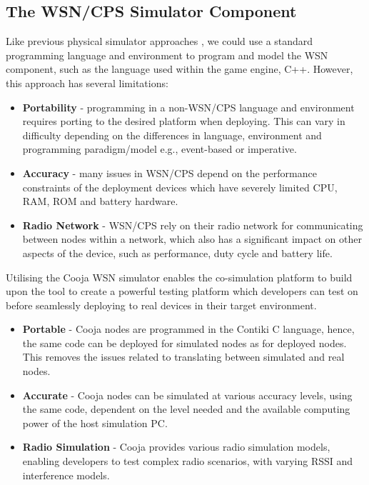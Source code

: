 \subsection{The WSN/CPS Simulator Component} %
\label{sub:a_wsn_cps_simulator}
Like previous physical simulator approaches \cite{6815220}, we could use a standard programming language and environment to program and model the WSN component, such as the language used within the game engine, C++. However, this approach has several limitations:
\begin{itemize}
  \item \textbf{Portability} - programming in a non-WSN/CPS language and environment requires porting to the desired platform when deploying. This can vary in difficulty depending on the differences in language, environment and programming paradigm/model e.g., event-based or imperative.
  \item \textbf{Accuracy} - many issues in WSN/CPS depend on the performance constraints of the deployment devices which have severely limited CPU, RAM, ROM and battery hardware.
  \item \textbf{Radio Network} - WSN/CPS rely on their radio network for communicating between nodes within a network, which also has a significant impact on other aspects of the device, such as performance, duty cycle and battery life.
\end{itemize}

Utilising the Cooja WSN simulator enables the co-simulation platform to build upon the tool to create a powerful testing platform which developers can test on before seamlessly deploying to real devices in their target environment.

\begin{itemize}
  \item \textbf{Portable} - Cooja nodes are programmed in the Contiki C language, hence, the same code can be deployed for simulated nodes as for deployed nodes. This removes the issues related to translating between simulated and real nodes.
  \item \textbf{Accurate} - Cooja nodes can be simulated at various accuracy levels, using the same code, dependent on the level needed and the available computing power of the host simulation PC.
  \item \textbf{Radio Simulation} - Cooja provides various radio simulation models, enabling developers to test complex radio scenarios, with varying RSSI and interference models. 
\end{itemize}

